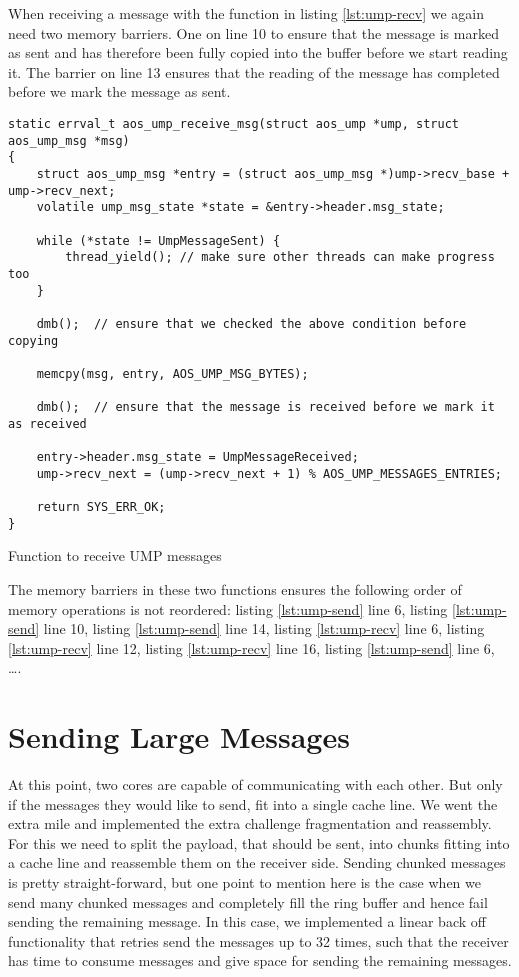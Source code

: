 When receiving a message with the function in listing \ref{lst:ump-recv} we again need two
memory barriers. One on line 10 to ensure that the message is marked as sent and has
therefore been fully copied into the buffer before we start reading it. The barrier on
line 13 ensures that the reading of the message has completed before we mark the message as sent.
\begin{listing}
\begin{verbatim}
static errval_t aos_ump_receive_msg(struct aos_ump *ump, struct aos_ump_msg *msg)
{
    struct aos_ump_msg *entry = (struct aos_ump_msg *)ump->recv_base + ump->recv_next;
    volatile ump_msg_state *state = &entry->header.msg_state;

    while (*state != UmpMessageSent) {
        thread_yield(); // make sure other threads can make progress too
    }

    dmb();  // ensure that we checked the above condition before copying

    memcpy(msg, entry, AOS_UMP_MSG_BYTES);

    dmb();  // ensure that the message is received before we mark it as received

    entry->header.msg_state = UmpMessageReceived;
    ump->recv_next = (ump->recv_next + 1) % AOS_UMP_MESSAGES_ENTRIES;

    return SYS_ERR_OK;
}
\end{verbatim}
\caption{Function to receive UMP messages}
\label{lst:ump-recv}
\end{listing}

The memory barriers in these two functions ensures the following order of memory operations is not reordered:
listing \ref{lst:ump-send} line 6, listing \ref{lst:ump-send} line 10, listing \ref{lst:ump-send} line 14,
listing \ref{lst:ump-recv} line 6, listing \ref{lst:ump-recv} line 12, listing \ref{lst:ump-recv} line 16,
listing \ref{lst:ump-send} line 6, \dots.

\section{Sending Large Messages}

At this point, two cores are capable of communicating with each other. But only
if the messages they would like to send, fit into a single cache line. We went
the extra mile and implemented the extra challenge fragmentation and reassembly.
For this we need to split the payload, that should be sent, into chunks fitting
into a cache line and reassemble them on the receiver side. Sending chunked
messages is pretty straight-forward, but one point to mention here is the case
when we send many chunked messages and completely fill the ring buffer and hence
fail sending the remaining message. In this case, we implemented a linear back
off functionality that retries send the messages up to 32 times, such that the
receiver has time to consume messages and give space for sending the remaining
messages.

